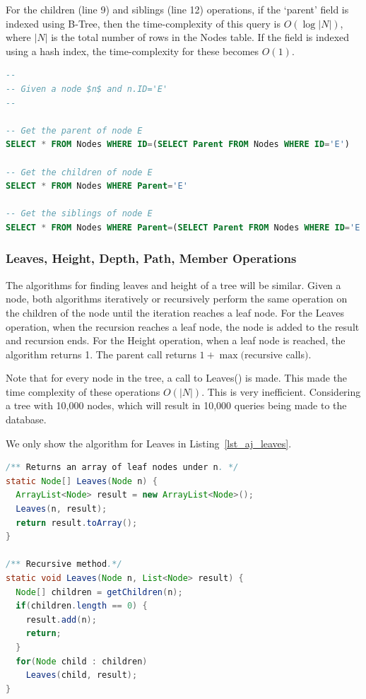 For the children (line 9) and siblings (line 12) operations, if the `parent' field is indexed using B-Tree\cite{Comer:1979:UB:356770.356776}, then the time-complexity of this query is $O(\log |N|)$, where $|N|$ is the total number of rows in the Nodes table. If the field is indexed using a hash index, the time-complexity for these becomes $O(1)$.

\begin{lstlisting}[language=sql,caption={Parent, Children, and Sibling}, label=lst_aj_parent, float]
--
-- Given a node $n$ and n.ID='E'
--

-- Get the parent of node E
SELECT * FROM Nodes WHERE ID=(SELECT Parent FROM Nodes WHERE ID='E')

-- Get the children of node E
SELECT * FROM Nodes WHERE Parent='E'

-- Get the siblings of node E
SELECT * FROM Nodes WHERE Parent=(SELECT Parent FROM Nodes WHERE ID='E') AND ID != 'E'

\end{lstlisting}

\subsubsection{Leaves, Height, Depth, Path, Member Operations}\label{sec_al_depth}

The algorithms for finding leaves and height of a tree will be similar. Given a node, both algorithms iteratively or recursively perform the same operation on the children of the node until the iteration reaches a leaf node. For the Leaves operation, when the recursion reaches a leaf node, the node is added to the result and recursion ends. For the Height operation, when a leaf node is reached, the algorithm returns 1. The parent call returns $1 + \max($recursive calls$)$.

Note that for every node in the tree, a call to Leaves() is made. This made the time complexity of these operations $O(|N|)$. This is very inefficient. Considering a tree with 10,000 nodes, which will result in 10,000 queries being made to the database.

We only show the algorithm for Leaves in Listing~\ref{lst_aj_leaves}.

\begin{lstlisting}[language=java,caption=Leaves, label=lst_aj_leaves, float]
/** Returns an array of leaf nodes under n. */
static Node[] Leaves(Node n) {
  ArrayList<Node> result = new ArrayList<Node>();
  Leaves(n, result);
  return result.toArray();
}

/** Recursive method.*/
static void Leaves(Node n, List<Node> result) {
  Node[] children = getChildren(n);
  if(children.length == 0) {
    result.add(n);
    return;
  }
  for(Node child : children)
    Leaves(child, result);
}

\end{lstlisting}

